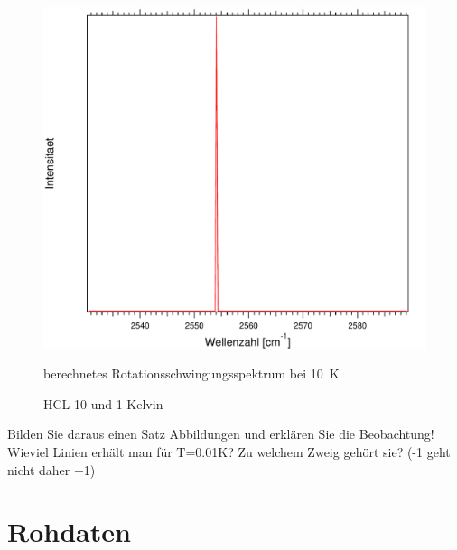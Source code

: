 \begin{figure}[H]
\centering	
	\begin{minipage}{0.47\linewidth}
	\includegraphics[width=\linewidth]{Bilder/001HCL.pdf}
	\caption{berechnetes Rotationsschwingungsspektrum bei 10~K}
	\end{minipage}

	\caption{HCL 10 und 1 Kelvin}
	
	
\end{figure}

Bilden Sie daraus einen Satz Abbildungen und erklären Sie die Beobachtung! Wieviel Linien erhält man für T=0.01K? Zu welchem Zweig gehört sie? (-1 geht nicht daher +1)
\section{Rohdaten}

